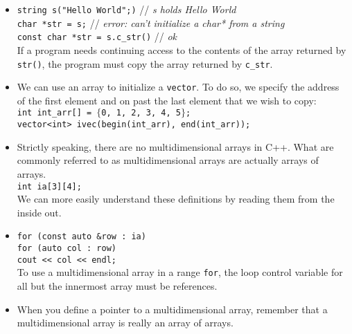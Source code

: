 \begin{itemize}
\item
\hspace*{1em}\texttt{string s("Hello World";)} // \textit{s holds Hello World}\\
\hspace*{1em}\texttt{char *str = s;} // \textit{error: can't initialize a char* from a string}\\
\hspace*{1em}\texttt{const char *str = s.c\_str()} // \textit{ok}\\
If a program needs continuing access to the contents of the array returned by \texttt{str()}, the program must copy the array returned by \texttt{c\_str}.

\item
We can use an array to initialize a \texttt{vector}. To do so, we specify the address of the first element and on past the last element that we wish to copy:\\
\hspace*{1em}\texttt{int int\_arr[] = $\{$0, 1, 2, 3, 4, 5$\}$;}\\
\hspace*{1em}\texttt{vector<int> ivec(begin(int\_arr), end(int\_arr));}

\item
Strictly speaking, there are no multidimensional arrays in C++. What are commonly referred to as multidimensional arrays are actually arrays of arrays.\\
\hspace*{1em}\texttt{int ia[3][4];}\\
We can more easily understand these definitions by reading them from the inside out.

\item
\hspace*{1em}\texttt{for (const auto \&row : ia)}\\
\hspace*{3em}\texttt{for (auto col : row)}\\
\hspace*{5em}\texttt{cout << col << endl;}\\
To use a multidimensional array in a range \texttt{for}, the loop control variable for all but the innermost array must be references.

\item
When you define a pointer to a multidimensional array, remember that a multidimensional array is really an array of arrays.

\end{itemize}
